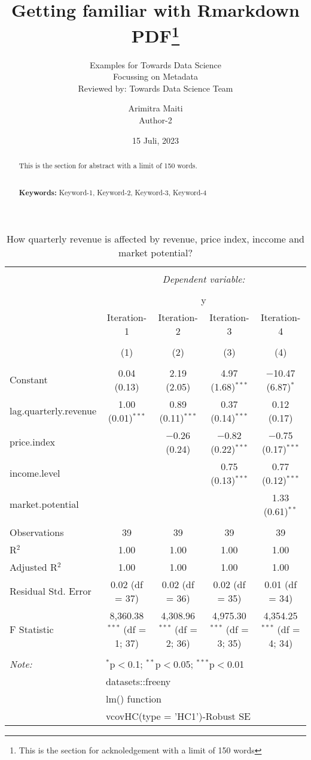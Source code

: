 \documentclass[
]{article}
\title{Getting familiar with Rmarkdown PDF\thanks{This is the section
for acknoledgement with a limit of 150 words}}
\subtitle{Examples for Towards Data Science\\
Focussing on Metadata\\
Reviewed by: Towards Data Science Team}
\author{Arimitra Maiti\\
Author-2}
\date{15 Juli, 2023}
\begin{document}
\maketitle
\begin{abstract}
This is the section for abstract with a limit of 150 words.\\
\par\\
\textbf{Keywords:} Keyword-1, Keyword-2, Keyword-3, Keyword-4
\end{abstract}

{
\setcounter{tocdepth}{2}
\tableofcontents
}
\begin{table}[!htbp] \centering 
  \caption{How quarterly revenue is affected by revenue, price index, inccome and market potential?} 
  \label{} 
\small 
\begin{tabular}{@{\extracolsep{5pt}}lcccc} 
\\[-1.8ex]\hline 
\hline \\[-1.8ex] 
 & \multicolumn{4}{c}{\textit{Dependent variable:}} \\ 
\cline{2-5} 
\\[-1.8ex] & \multicolumn{4}{c}{y} \\ 
 & Iteration-1 & Iteration-2 & Iteration-3 & Iteration-4 \\ 
\\[-1.8ex] & (1) & (2) & (3) & (4)\\ 
\hline \\[-1.8ex] 
 Constant & 0.04 (0.13) & 2.19 (2.05) & 4.97 (1.68)$^{***}$ & $-$10.47 (6.87)$^{*}$ \\ 
  lag.quarterly.revenue & 1.00 (0.01)$^{***}$ & 0.89 (0.11)$^{***}$ & 0.37 (0.14)$^{***}$ & 0.12 (0.17) \\ 
  price.index &  & $-$0.26 (0.24) & $-$0.82 (0.22)$^{***}$ & $-$0.75 (0.17)$^{***}$ \\ 
  income.level &  &  & 0.75 (0.13)$^{***}$ & 0.77 (0.12)$^{***}$ \\ 
  market.potential &  &  &  & 1.33 (0.61)$^{**}$ \\ 
 \hline \\[-1.8ex] 
Observations & 39 & 39 & 39 & 39 \\ 
R$^{2}$ & 1.00 & 1.00 & 1.00 & 1.00 \\ 
Adjusted R$^{2}$ & 1.00 & 1.00 & 1.00 & 1.00 \\ 
Residual Std. Error & 0.02 (df = 37) & 0.02 (df = 36) & 0.02 (df = 35) & 0.01 (df = 34) \\ 
F Statistic & 8,360.38$^{***}$ (df = 1; 37) & 4,308.96$^{***}$ (df = 2; 36) & 4,975.30$^{***}$ (df = 3; 35) & 4,354.25$^{***}$ (df = 4; 34) \\ 
\hline 
\hline \\[-1.8ex] 
\textit{Note:}  & \multicolumn{4}{l}{$^{*}$p$<$0.1; $^{**}$p$<$0.05; $^{***}$p$<$0.01} \\ 
 & \multicolumn{4}{l}{datasets::freeny} \\ 
 & \multicolumn{4}{l}{lm() function} \\ 
 & \multicolumn{4}{l}{vcovHC(type = 'HC1')-Robust SE} \\ 
\end{tabular} 
\end{table}

  
\end{document}
